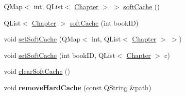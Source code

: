 \begin{DoxyCompactItemize}
\item 
QMap$<$ int, QList$<$ \hyperlink{structChapter}{Chapter} $>$ $>$ \hyperlink{classZefaniaBible_abc7e89561a9b87d4cb5511f29c7e51a6}{softCache} ()
\item 
QList$<$ \hyperlink{structChapter}{Chapter} $>$ \hyperlink{classZefaniaBible_a89c9044afabfd52fc35a9ec2ce7c53e7}{softCache} (int bookID)
\item 
void \hyperlink{classZefaniaBible_a448849cb1b174285d54022dcb86ab8f3}{setSoftCache} (QMap$<$ int, QList$<$ \hyperlink{structChapter}{Chapter} $>$ $>$)
\item 
void \hyperlink{classZefaniaBible_aed51eb121c18afbb927fd9dd27eb067c}{setSoftCache} (int bookID, QList$<$ \hyperlink{structChapter}{Chapter} $>$ c)
\item 
void \hyperlink{classZefaniaBible_ae93f27ca8ff9b7076cbe7df1575d2228}{clearSoftCache} ()
\item 
\hypertarget{classZefaniaBible_a6674b121cf33de65102e7fea48c1cf01}{
void {\bfseries removeHardCache} (const QString \&path)}
\label{classZefaniaBible_a6674b121cf33de65102e7fea48c1cf01}

\end{DoxyCompactItemize}
